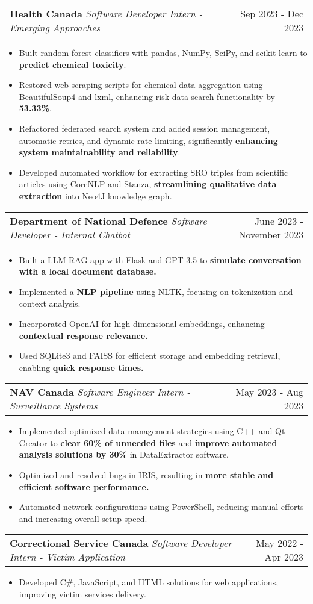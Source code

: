 \documentclass[letterpaper,11pt]{article}
\makeatletter
\newcommand{\resumeItem}[1]{
  \item\small{
    {#1 \vspace{-2pt}}
  }
}
\newcommand{\resumeSubheading}[3]{
    \item
    \begin{tabular*}{0.97\textwidth}[t]{l@{\extracolsep{\fill}}r}
      \textbf{#1} \textbar \textit{ #2} & #3 \\
    \end{tabular*}\vspace{-4.5pt}
}
\newcommand{\resumeItemListStart}{\begin{itemize}}
\newcommand{\resumeItemListEnd}{\end{itemize}\vspace{-5pt}}
\makeatother
\begin{document}
    \resumeSubheading
      {Health Canada}{Software Developer Intern - Emerging Approaches}{Sep 2023 - Dec 2023}
      \resumeItemListStart
        \resumeItem{Built random forest classifiers with pandas, NumPy, SciPy, and scikit-learn to \textbf{predict chemical toxicity}.}
        \resumeItem{Restored web scraping scripts for chemical data aggregation using BeautifulSoup4 and lxml, enhancing risk data search functionality by \textbf{53.33\%}.}
        \resumeItem{Refactored federated search system and added session management, automatic retries, and dynamic rate limiting, significantly \textbf{enhancing system maintainability and reliability}.}
        \resumeItem{Developed automated workflow for extracting SRO triples from scientific articles using CoreNLP and Stanza, \textbf{streamlining qualitative data extraction} into Neo4J knowledge graph.}
      \resumeItemListEnd

    \resumeSubheading
    {Department of National Defence}{Software Developer - Internal Chatbot}{June 2023 - November 2023}
      \resumeItemListStart
        \resumeItem{Built a LLM RAG app with Flask and GPT-3.5 to \textbf{simulate conversation with a local document database.}}
        \resumeItem{Implemented a \textbf{NLP pipeline} using NLTK, focusing on tokenization and context analysis.}
        \resumeItem{Incorporated OpenAI for high-dimensional embeddings, enhancing \textbf{contextual response relevance.}}
        \resumeItem{Used SQLite3 and FAISS for efficient storage and embedding retrieval, enabling \textbf{quick response times.}}
      \resumeItemListEnd

    \resumeSubheading
    {NAV Canada}{Software Engineer Intern - Surveillance Systems}{May 2023 - Aug 2023}
      \resumeItemListStart
        \resumeItem{Implemented optimized data management strategies using C++ and Qt Creator to \textbf{clear 60\% of unneeded files} and \textbf{improve automated analysis solutions by 30\%} in DataExtractor software.}
        \resumeItem{Optimized and resolved bugs in IRIS, resulting in \textbf{more stable and efficient software performance.}}
        \resumeItem{Automated network configurations using PowerShell, reducing manual efforts and increasing overall setup speed.}
      \resumeItemListEnd

    \resumeSubheading
    {Correctional Service Canada}{Software Developer Intern - Victim Application}{May 2022 - Apr 2023}
      \resumeItemListStart
        \resumeItem{Developed C\#, JavaScript, and HTML solutions for web applications, improving victim services delivery.}
      \resumeItemListEnd
\end{document}
